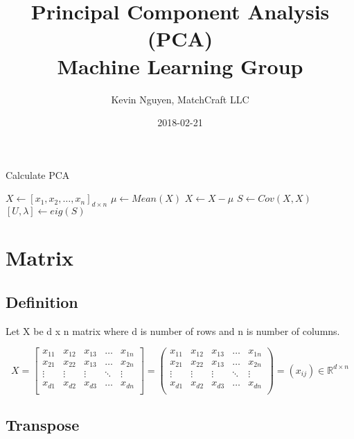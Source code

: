 \documentclass{article}
\title{Principal Component Analysis (PCA) \\ Machine Learning Group}
\date{2018-02-21}
\author{Kevin Nguyen, MatchCraft LLC}
\begin{document}
\maketitle

\begin{algorithm}
  \caption{Calculate PCA}
  \begin{algorithmic}
    \State $X \gets [x_1, x_2, \dots, x_n]_{d \times n}$ 
    \State $\mu \gets Mean(X)$ 
    \State $X \gets X - \mu$ 
    \State $S \gets Cov(X,X)$ 
    \State $[U,\lambda] \gets eig(S)$ 
  \end{algorithmic}
\end{algorithm}


\section{Matrix}
\subsection{Definition}
Let X be d x n matrix where d is number of rows and n is number of columns.

$$
X =
\begin{bmatrix}
  x_{11} & x_{12} & x_{13} & \dots & x_{1n} \\
  x_{21} & x_{22} & x_{13} & \dots & x_{2n} \\
  \vdots & \vdots & \vdots & \ddots & \vdots \\
  x_{d1} & x_{d2} & x_{d3} & \dots & x_{dn} \\
\end{bmatrix}
=
\begin{pmatrix}
  x_{11} & x_{12} & x_{13} & \dots & x_{1n} \\
  x_{21} & x_{22} & x_{13} & \dots & x_{2n} \\
  \vdots & \vdots & \vdots & \ddots & \vdots \\
  x_{d1} & x_{d2} & x_{d3} & \dots & x_{dn} \\
\end{pmatrix}
= (x_{ij}) \in \mathbb{R}^{d \times n}
$$

\subsection{Transpose}
\end{document}

